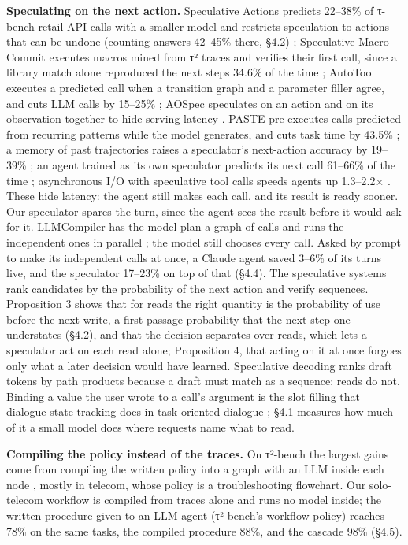 \documentclass[10pt,twocolumn,letterpaper]{article}
\newcommand{\runin}[1]{{\sffamily\bfseries\color{accent}#1}}
\begin{document}
\runin{Speculating on the next action.} Speculative Actions predicts 22--38\% of τ-bench retail API calls with a smaller model and restricts speculation to actions that can be undone (counting answers 42--45\% there, §4.2) \citep{ye2026speculativeactions}; Speculative Macro Commit executes macros mined from τ² traces and verifies their first call, since a library match alone reproduced the next steps 34.6\% of the time \citep{liu2026macrocommit}; AutoTool executes a predicted call when a transition graph and a parameter filler agree, and cuts LLM calls by 15--25\% \citep{jia2026autotool}; AOSpec speculates on an action and on its observation together to hide serving latency \citep{chen2026aospec}. PASTE pre-executes calls predicted from recurring patterns while the model generates, and cuts task time by 43.5\% \citep{sui2026paste}; a memory of past trajectories raises a speculator's next-action accuracy by 19--39\% \citep{li2026specmemory}; an agent trained as its own speculator predicts its next call 61--66\% of the time \citep{ji2026specreason}; asynchronous I/O with speculative tool calls speeds agents up 1.3--2.2× \citep{hooper2026speculativeinteraction}. These hide latency: the agent still makes each call, and its result is ready sooner. Our speculator spares the turn, since the agent sees the result before it would ask for it. LLMCompiler has the model plan a graph of calls and runs the independent ones in parallel \citep{kim2024llmcompiler}; the model still chooses every call. Asked by prompt to make its independent calls at once, a Claude agent saved 3--6\% of its turns live, and the speculator 17--23\% on top of that (§4.4). The speculative systems rank candidates by the probability of the next action and verify sequences. Proposition 3 shows that for reads the right quantity is the probability of use before the next write, a first-passage probability that the next-step one understates (§4.2), and that the decision separates over reads, which lets a speculator act on each read alone; Proposition 4, that acting on it at once forgoes only what a later decision would have learned. Speculative decoding \citep{leviathan2023speculative, li2024eagle2, huang2024specdecpp} ranks draft tokens by path products because a draft must match as a sequence; reads do not. Binding a value the user wrote to a call's argument is the slot filling that dialogue state tracking does in task-oriented dialogue \citep{wu2019trade}; §4.1 measures how much of it a small model does where requests name what to read.

\runin{Compiling the policy instead of the traces.} On τ²-bench the largest gains come from compiling the written policy into a graph with an LLM inside each node \citep{luo2026stage, kang2026policyguide}, mostly in telecom, whose policy is a troubleshooting flowchart. Our solo-telecom workflow is compiled from traces alone and runs no model inside; the written procedure given to an LLM agent (τ²-bench's workflow policy) reaches 78\% on the same tasks, the compiled procedure 88\%, and the cascade 98\% (§4.5).
\end{document}
